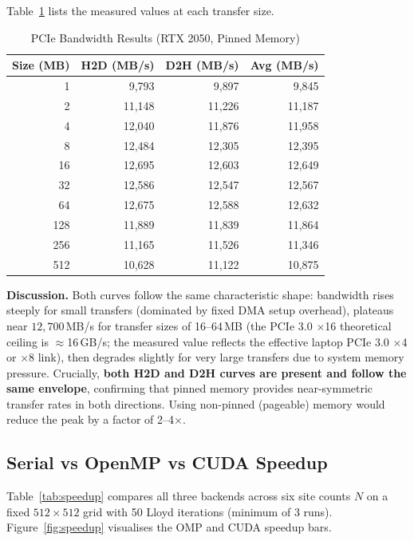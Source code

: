 \documentclass[12pt,a4paper]{article}
\begin{document}
Table~\ref{tab:bw} lists the measured values at each transfer size.

\begin{table}[h!]
\centering
\caption{PCIe Bandwidth Results (RTX 2050, Pinned Memory)}
\label{tab:bw}
\begin{tabular}{rrrr}
\toprule
\textbf{Size (MB)} & \textbf{H2D (MB/s)} & \textbf{D2H (MB/s)} & \textbf{Avg (MB/s)} \\
\midrule
1   & 9{,}793  & 9{,}897  & 9{,}845  \\
2   & 11{,}148 & 11{,}226 & 11{,}187 \\
4   & 12{,}040 & 11{,}876 & 11{,}958 \\
8   & 12{,}484 & 12{,}305 & 12{,}395 \\
16  & 12{,}695 & 12{,}603 & 12{,}649 \\
32  & 12{,}586 & 12{,}547 & 12{,}567 \\
64  & 12{,}675 & 12{,}588 & 12{,}632 \\
128 & 11{,}889 & 11{,}839 & 11{,}864 \\
256 & 11{,}165 & 11{,}526 & 11{,}346 \\
512 & 10{,}628 & 11{,}122 & 10{,}875 \\
\bottomrule
\end{tabular}
\end{table}

\noindent\textbf{Discussion.}
Both curves follow the same characteristic shape: bandwidth rises steeply for
small transfers (dominated by fixed DMA setup overhead), plateaus near
$12{,}700$\,MB/s for transfer sizes of 16--64\,MB (the PCIe 3.0 $\times$16
theoretical ceiling is $\approx$16\,GB/s; the measured value reflects the
effective laptop PCIe 3.0 $\times$4 or $\times$8 link), then degrades slightly
for very large transfers due to system memory pressure.  Crucially, \textbf{both
H2D and D2H curves are present and follow the same envelope}, confirming that
pinned memory provides near-symmetric transfer rates in both directions.
Using non-pinned (pageable) memory would reduce the peak by a factor of
2--4$\times$.

\subsection{Serial vs OpenMP vs CUDA Speedup}

Table~\ref{tab:speedup} compares all three backends across six site counts $N$
on a fixed $512\times512$ grid with 50 Lloyd iterations (minimum of 3 runs).
Figure~\ref{fig:speedup} visualises the OMP and CUDA speedup bars.
\end{document}
